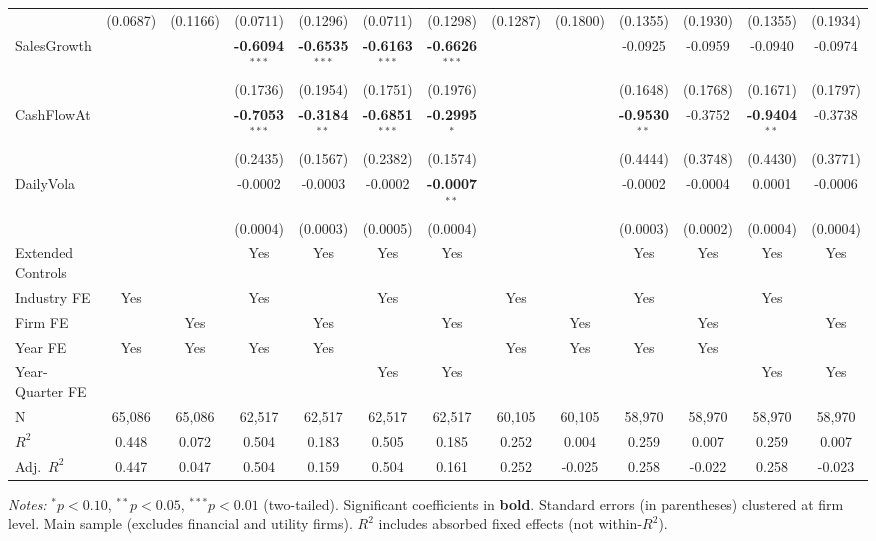 \begin{landscape}
\begin{table}[H]
\begin{tabular}{lcccccccccccc}
 & (0.0687) & (0.1166) & (0.0711) & (0.1296) & (0.0711) & (0.1298) & (0.1287) & (0.1800) & (0.1355) & (0.1930) & (0.1355) & (0.1934) \\
SalesGrowth &  &  & \textbf{-0.6094}$^{***}$ & \textbf{-0.6535}$^{***}$ & \textbf{-0.6163}$^{***}$ & \textbf{-0.6626}$^{***}$ &  &  & -0.0925 & -0.0959 & -0.0940 & -0.0974 \\
 &  &  & (0.1736) & (0.1954) & (0.1751) & (0.1976) &  &  & (0.1648) & (0.1768) & (0.1671) & (0.1797) \\
CashFlowAt &  &  & \textbf{-0.7053}$^{***}$ & \textbf{-0.3184}$^{**}$ & \textbf{-0.6851}$^{***}$ & \textbf{-0.2995}$^{*}$ &  &  & \textbf{-0.9530}$^{**}$ & -0.3752 & \textbf{-0.9404}$^{**}$ & -0.3738 \\
 &  &  & (0.2435) & (0.1567) & (0.2382) & (0.1574) &  &  & (0.4444) & (0.3748) & (0.4430) & (0.3771) \\
DailyVola &  &  & -0.0002 & -0.0003 & -0.0002 & \textbf{-0.0007}$^{**}$ &  &  & -0.0002 & -0.0004 & 0.0001 & -0.0006 \\
 &  &  & (0.0004) & (0.0003) & (0.0005) & (0.0004) &  &  & (0.0003) & (0.0002) & (0.0004) & (0.0004) \\
\midrule
Extended Controls &  &  & Yes & Yes & Yes & Yes &  &  & Yes & Yes & Yes & Yes \\
Industry FE & Yes &  & Yes &  & Yes &  & Yes &  & Yes &  & Yes &  \\
Firm FE &  & Yes &  & Yes &  & Yes &  & Yes &  & Yes &  & Yes \\
Year FE & Yes & Yes & Yes & Yes &  &  & Yes & Yes & Yes & Yes &  &  \\
Year-Quarter FE &  &  &  &  & Yes & Yes &  &  &  &  & Yes & Yes \\
\midrule
N & 65,086 & 65,086 & 62,517 & 62,517 & 62,517 & 62,517 & 60,105 & 60,105 & 58,970 & 58,970 & 58,970 & 58,970 \\
$R^2$ & 0.448 & 0.072 & 0.504 & 0.183 & 0.505 & 0.185 & 0.252 & 0.004 & 0.259 & 0.007 & 0.259 & 0.007 \\
Adj.~$R^2$ & 0.447 & 0.047 & 0.504 & 0.159 & 0.504 & 0.161 & 0.252 & -0.025 & 0.258 & -0.022 & 0.258 & -0.023 \\
\bottomrule
\end{tabular}
\begin{minipage}{\linewidth}
\vspace{2pt}\scriptsize
\textit{Notes:} $^{*}p<0.10$, $^{**}p<0.05$, $^{***}p<0.01$ (two-tailed).
 Significant coefficients in \textbf{bold}.
 Standard errors (in parentheses) clustered at firm level.
 Main sample (excludes financial and utility firms).
 $R^2$ includes absorbed fixed effects (not within-$R^2$).
\end{minipage}
\end{table}
\end{landscape}